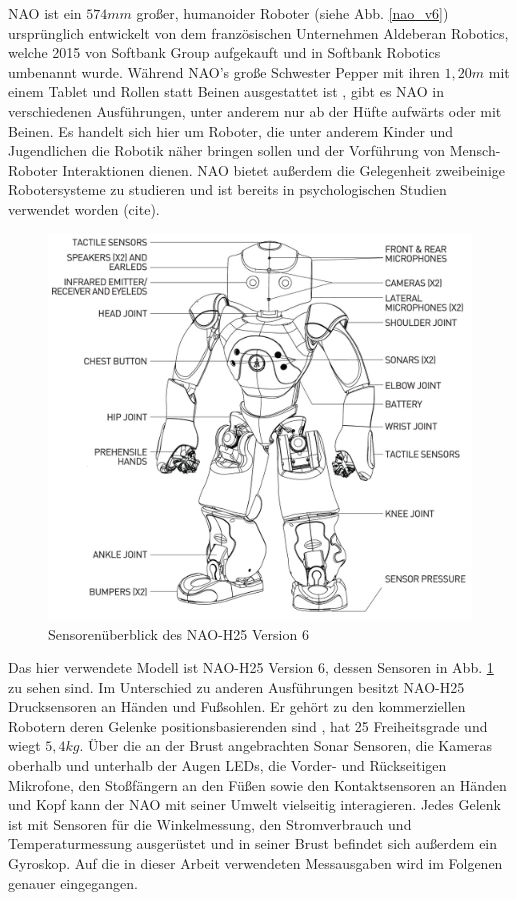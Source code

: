 NAO ist ein $574 \unit{mm}$ großer, humanoider Roboter (siehe Abb. \ref{nao_v6}) ursprünglich entwickelt von dem französischen Unternehmen Aldeberan Robotics, welche 2015 von Softbank Group aufgekauft \cite{aldebaran_to_softbank} und in Softbank Robotics umbenannt wurde. Während NAO's große Schwester Pepper mit ihren $1,20 \unit{m}$ mit einem Tablet und Rollen statt Beinen ausgestattet ist \cite{about_pepper}, gibt es NAO in verschiedenen Ausführungen, unter anderem nur ab der Hüfte aufwärts oder mit Beinen. Es handelt sich hier um Roboter, die unter anderem Kinder und Jugendlichen die Robotik näher bringen sollen und der Vorführung von Mensch-Roboter Interaktionen dienen. NAO bietet außerdem die Gelegenheit zweibeinige Robotersysteme zu studieren und ist bereits in psychologischen Studien verwendet worden (cite). 

\begin{figure}[hb]
	\centering
	\vspace{2cm}
	\includegraphics[width=0.7\linewidth]{Bilder/nao_h25_pres.png}
	\caption{Sensorenüberblick des NAO-H25 Version 6 \cite[in /H25]{nao_naoqi_docu}}
	\label{nao_v6_h25}
\end{figure}  

Das hier verwendete Modell ist NAO-H25 Version 6, dessen Sensoren in Abb. \ref{nao_v6_h25} zu sehen sind. Im Unterschied zu anderen Ausführungen besitzt NAO-H25 Drucksensoren an Händen und Fußsohlen. Er gehört zu den kommerziellen Robotern deren Gelenke positionsbasierenden sind \cite{balance_strategy}, hat 25 Freiheitsgrade und wiegt $5,4\unit{kg}$. Über die an der Brust angebrachten Sonar Sensoren, die Kameras oberhalb und unterhalb der Augen LEDs, die Vorder- und Rückseitigen Mikrofone, den Stoßfängern an den Füßen sowie den Kontaktsensoren an Händen und Kopf kann der NAO mit seiner Umwelt vielseitig interagieren. Jedes Gelenk ist mit Sensoren für die Winkelmessung, den Stromverbrauch und Temperaturmessung ausgerüstet und in seiner Brust befindet sich außerdem ein Gyroskop. Auf die in dieser Arbeit verwendeten Messausgaben wird im Folgenen genauer eingegangen.

